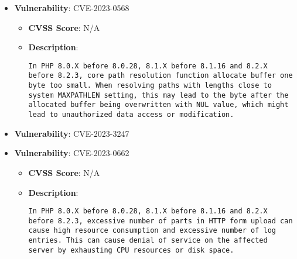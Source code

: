 \documentclass{article}
\begin{document}
\begin{itemize}
        \item \textbf{Vulnerability}: CVE-2023-0568
        \begin{itemize}
            \item \textbf{CVSS Score}:  N/A 
            \item \textbf{Description}:
            \parbox[t]{0.9\linewidth}{
                \verb|In PHP 8.0.X before 8.0.28, 8.1.X before 8.1.16 and 8.2.X before 8.2.3, core path resolution function allocate buffer one byte too small. When resolving paths with lengths close to system MAXPATHLEN setting, this may lead to the byte after the allocated buffer being overwritten with NUL value, which might lead to unauthorized data access or modification. |
            }
        \end{itemize}
    
        \item \textbf{Vulnerability}: CVE-2023-3247
    
        \item \textbf{Vulnerability}: CVE-2023-0662
        \begin{itemize}
            \item \textbf{CVSS Score}:  N/A 
            \item \textbf{Description}:
            \parbox[t]{0.9\linewidth}{
                \verb|In PHP 8.0.X before 8.0.28, 8.1.X before 8.1.16 and 8.2.X before 8.2.3, excessive number of parts in HTTP form upload can cause high resource consumption and excessive number of log entries. This can cause denial of service on the affected server by exhausting CPU resources or disk space. |
            }
        \end{itemize}
    

\end{itemize}
\end{document}
